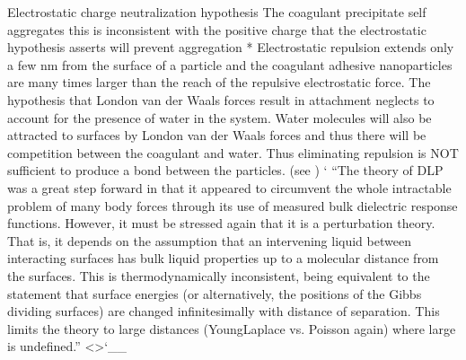 \documentclass[letterpaper,10pt,english]{sphinxmanual}
\begin{document}
Electrostatic charge neutralization hypothesis The coagulant precipitate self aggregates \textendash{} this is inconsistent with the positive charge that the electrostatic hypothesis asserts will prevent aggregation * Electrostatic repulsion extends only a few nm from the surface of a particle \textendash{} and the coagulant adhesive nanoparticles are many times larger than the reach of the repulsive electrostatic force. The hypothesis that London van der Waals forces result in attachment neglects to account for the presence of water in the system. Water molecules will also be attracted to surfaces by London van der Waals forces and thus there will be competition between the coagulant and water. Thus eliminating repulsion is NOT sufficient to produce a bond between the particles. (see ) {}` “The theory of DLP was a great step forward in that it appeared to circumvent the whole intractable problem of many body forces through its use of measured bulk dielectric response functions. However, it must be stressed again that it is a perturbation theory. That is, it depends on the assumption that an intervening liquid between interacting surfaces has bulk liquid properties up to a molecular distance from the surfaces. This is thermodynamically inconsistent, being equivalent to the statement that surface energies (or alternatively, the positions of the Gibbs dividing surfaces) are changed infinitesimally with distance of separation. This limits the theory to large distances (Young\textendash{}Laplace vs. Poisson again) where large is undefined.” \textless{}\textgreater{}{}`\_\_
\end{document}
